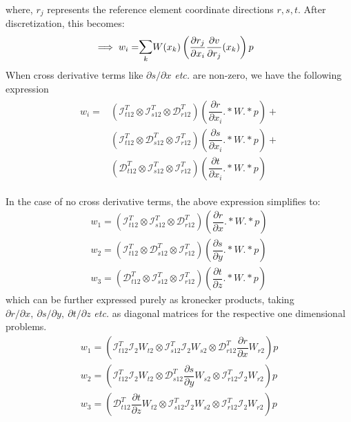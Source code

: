 \documentclass{kthreport}
\begin{document}
where, $r_{j}$ represents the reference element coordinate directions $r,s,t$.
After discretization, this becomes:
\begin{eqnarray}
	\implies w_{i}	=& \mathlarger\sum_{k} W(x_{k})\left(\dfrac{\partial r_{j}}{\partial x_{i}}\dfrac{\partial v}{\partial r_{j}}(x_{k})\right)p  \nonumber
\end{eqnarray}
When cross derivative terms like $\partial s/\partial x$ \textit{etc.} are non-zero, we have the following expression
\begin{eqnarray}
	\begin{split}
		w_{i}	=&  (\mathcal{I}^{T}_{t12}\otimes\mathcal{I}^{T}_{s12}\otimes\mathcal{D}^{T}_{r12})(\dfrac{\partial r}{\partial x_{i}}.*W.*p) + \\
		& (\mathcal{I}^{T}_{t12}\otimes\mathcal{D}^{T}_{s12}\otimes\mathcal{I}^{T}_{r12})(\dfrac{\partial s}{\partial x_{i}}.*W.*p) + \\
		& (\mathcal{D}^{T}_{t12}\otimes\mathcal{I}^{T}_{s12}\otimes\mathcal{I}^{T}_{r12})(\dfrac{\partial t}{\partial {x_{i}}}.*W.*p)			
	\end{split}
\end{eqnarray}

In the case of no cross derivative terms, the above expression simplifies to:
\begin{subequations}
	\begin{eqnarray}
		w_{1}	= (\mathcal{I}^{T}_{t12}\otimes\mathcal{I}^{T}_{s12}\otimes\mathcal{D}^{T}_{r12})(\dfrac{\partial r}{\partial x}.*W.*p) \\
		w_{2}	= (\mathcal{I}^{T}_{t12}\otimes\mathcal{D}^{T}_{s12}\otimes\mathcal{I}^{T}_{r12})(\dfrac{\partial s}{\partial y}.*W.*p) \\
		w_{3}	= (\mathcal{D}^{T}_{t12}\otimes\mathcal{I}^{T}_{s12}\otimes\mathcal{I}^{T}_{r12})(\dfrac{\partial t}{\partial z}.*W.*p)
	\end{eqnarray}
\end{subequations}
which can be further expressed purely as kronecker products, taking $\partial r/\partial x,\ \partial s/\partial y,\ \partial t/\partial z$ \textit{etc.} as diagonal matrices for the respective one dimensional problems.
\begin{subequations}
	\begin{eqnarray}
		w_{1}	= (\mathcal{I}^{T}_{t12}\mathcal{I}_{2}W_{t2}\otimes\mathcal{I}^{T}_{s12}\mathcal{I}_{2}W_{s2}\otimes\mathcal{D}^{T}_{r12}\dfrac{\partial r}{\partial x}W_{r2})p \\
		w_{2}	= (\mathcal{I}^{T}_{t12}\mathcal{I}_{2}W_{t2}\otimes\mathcal{D}^{T}_{s12}\dfrac{\partial s}{\partial y}W_{s2}\otimes\mathcal{I}^{T}_{r12}\mathcal{I}_{2}W_{r2})p \\
		w_{3}	= (\mathcal{D}^{T}_{t12}\dfrac{\partial t}{\partial z}W_{t2}\otimes\mathcal{I}^{T}_{s12}\mathcal{I}_{2}W_{s2}\otimes\mathcal{I}^{T}_{r12}\mathcal{I}_{2}W_{r2})p
	\end{eqnarray}
\end{subequations}
\end{document}
